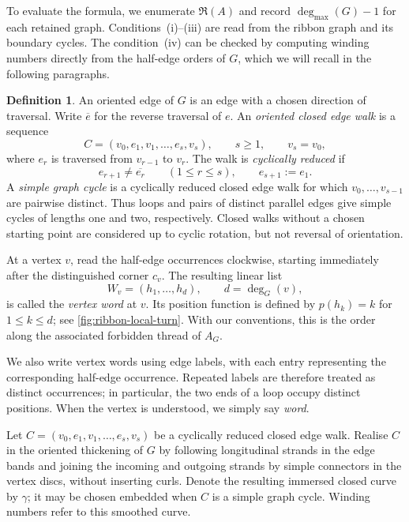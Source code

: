 \documentclass[11pt]{amsart}
\theoremstyle{definition}
\theoremstyle{plain}
\theoremstyle{definition}
\newtheorem{definition}[definition]{Definition}
\theoremstyle{definition}
\newcommand{\degmax}{\deg_{\max}}
\begin{document}
To evaluate the formula, we enumerate $\mathfrak R(A)$ and record
$\degmax(G)-1$ for each retained graph.  Conditions~(i)--(iii)
are read from the ribbon graph and its boundary cycles. 
The condition~(iv) can be checked by computing winding numbers directly from the
half-edge orders of $G$, which we will recall in the following paragraphs.

\begin{definition}
\label{def:ribbon-closed-walk}
An oriented edge of $G$ is an edge with a chosen direction of
traversal.  Write $\overline e$ for the reverse traversal
of $e$.  An \emph{oriented closed edge walk} is a sequence
\[
  C=(v_0,e_1,v_1,\ldots,e_s,v_s),
  \qquad s\geq1,\qquad v_s=v_0,
\]
where $e_r$ is traversed from $v_{r-1}$ to $v_r$. The walk is
\emph{cyclically reduced} if
\[
  e_{r+1}\neq\overline{e_r}
  \qquad(1\leq r\leq s),\qquad e_{s+1}:=e_1.
\]
A \emph{simple graph cycle} is a cyclically reduced closed edge
walk for which $v_0,\ldots,v_{s-1}$ are pairwise distinct.
Thus loops and pairs of distinct parallel edges give simple
cycles of lengths one and two, respectively.  Closed walks
without a chosen starting point are considered up to cyclic
rotation, but not reversal of orientation.
\end{definition}


At a vertex $v$, read the half-edge occurrences clockwise,
starting immediately after the distinguished corner $c_v$.
The resulting linear list
\[
  W_v=(h_1,\ldots,h_d),\qquad d=\deg_G(v),
\]
is called the \emph{vertex word} at $v$.  Its position function
is defined by $p(h_k)=k$ for $1\leq k\leq d$; see \cref{fig:ribbon-local-turn}.
With our conventions, this is the order along the associated
forbidden thread of $A_G$.

We also write vertex words using edge labels, with each entry
representing the corresponding half-edge occurrence.  Repeated
labels are therefore treated as distinct occurrences; in
particular, the two ends of a loop occupy distinct positions.
When the vertex is understood, we simply say \emph{word}.

Let $C=(v_0,e_1,v_1,\ldots,e_s,v_s)$ be a cyclically reduced
closed edge walk.
Realise $C$ in the oriented thickening of $G$ by following
longitudinal strands in the edge bands and joining the incoming
and outgoing strands by simple connectors in the vertex discs,
without inserting curls.  Denote the resulting immersed closed
curve by $\gamma$; it may be chosen embedded when $C$ is a simple
graph cycle.  Winding numbers refer to this smoothed curve.
\end{document}
